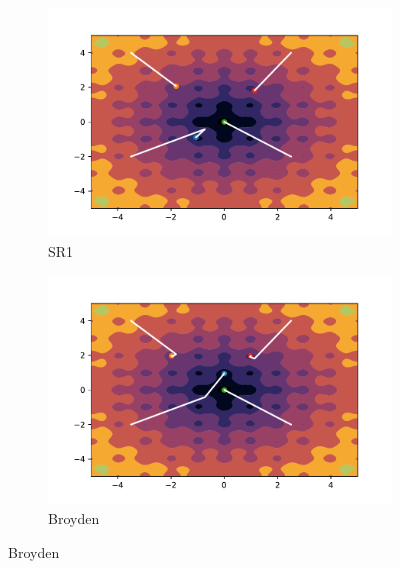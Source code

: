 \begin{figure}[h!]
    \begin{subfigure}{0.5\textwidth}
        \includegraphics[width=\textwidth, trim=1cm 0.5cm 1.3cm 1cm, clip]{assets/SR1/ackley.pdf}
        \caption{SR1}
    \end{subfigure}
    \begin{subfigure}{0.5\textwidth}
        \includegraphics[width=\textwidth, trim=1cm 0.5cm 1.3cm 1cm, clip]{assets/Broyden/ackley.pdf}
        \caption{Broyden}
    \end{subfigure}
\end{figure}
